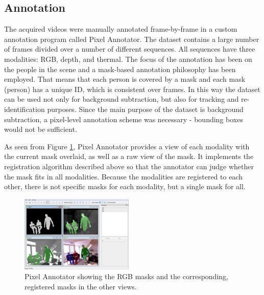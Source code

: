 \documentclass[10pt,twocolumn,letterpaper]{article}
\begin{document}
\subsection{Annotation}
%
The acquired videos were manually annotated frame-by-frame in a custom annotation program called Pixel Annotator. The dataset contains a large number of frames divided over a number of different sequences. All sequences have three modalities: RGB, depth, and thermal. The focus of the annotation has been on the people in the scene and a mask-based annotation philosophy has been employed. That means that each person is covered by a mask and each mask (person) has a unique ID, which is consistent over frames. In this way the dataset can be used not only for background subtraction, but also for tracking and re-identification purposes. Since the main purpose of the dataset is background subtraction, a pixel-level annotation scheme was necessary - bounding boxes would not be sufficient.
 
As seen from Figure \ref{fig:pixelannotator}, Pixel Annotator provides a view of each modality with the current mask overlaid, as well as a raw view of the mask. It implements the registration algorithm described above so that the annotator can judge whether the mask fits in all modalities. Because the modalities are registered to each other, there is not specific masks for each modality, but a single mask for all.

\begin{figure}%
\includegraphics[width=0.48\textwidth]{pixelannotator2.png}%
\caption{Pixel Annotator showing the RGB masks and the corresponding, registered masks in the other views.}%
\label{fig:pixelannotator}%
\end{figure}
\end{document}
